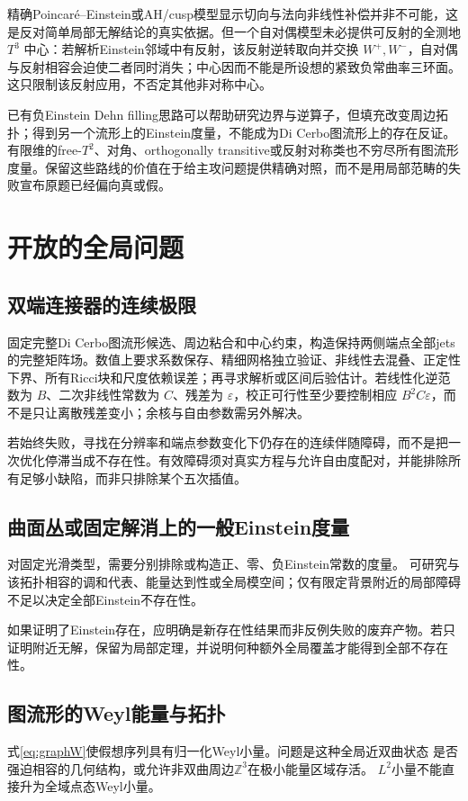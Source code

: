 \documentclass[UTF8,a4paper,11pt,fontset=fandol]{ctexart}
\numberwithin{equation}{section}
\theoremstyle{definition}
\newcommand{\Z}{\mathbb Z}
\begin{document}
精确Poincar\'e--Einstein或AH/cusp模型显示切向与法向非线性补偿并非不可能，这是反对简单局部无解结论的真实依据。但一个自对偶模型未必提供可反射的全测地 $T^3$ 中心：若解析Einstein邻域中有反射，该反射逆转取向并交换 $W^+,W^-$，自对偶与反射相容会迫使二者同时消失；中心因而不能是所设想的紧致负常曲率三环面。这只限制该反射应用，不否定其他非对称中心。

已有负Einstein Dehn filling思路可以帮助研究边界与逆算子，但填充改变周边拓扑；得到另一个流形上的Einstein度量，不能成为Di Cerbo图流形上的存在反证。有限维的free-$T^2$、对角、orthogonally transitive或反射对称类也不穷尽所有图流形度量。保留这些路线的价值在于给主攻问题提供精确对照，而不是用局部范畴的失败宣布原题已经偏向真或假。

\section{开放的全局问题}
\subsection{双端连接器的连续极限}
固定完整Di Cerbo图流形候选、周边粘合和中心约束，构造保持两侧端点全部jets的完整矩阵场。数值上要求系数保存、精细网格独立验证、非线性去混叠、正定性下界、所有Ricci块和尺度依赖误差；再寻求解析或区间后验估计。若线性化逆范数为 $B$、二次非线性常数为 $C$、残差为 $\varepsilon$，校正可行性至少要控制相应 $B^2C\varepsilon$，而不是只让离散残差变小；余核与自由参数需另外解决。

若始终失败，寻找在分辨率和端点参数变化下仍存在的连续伴随障碍，而不是把一次优化停滞当成不存在性。有效障碍须对真实方程与允许自由度配对，并能排除所有足够小缺陷，而非只排除某个五次插值。

\subsection{曲面丛或固定解消上的一般Einstein度量}
对固定光滑类型，需要分别排除或构造正、零、负Einstein常数的度量。
可研究与该拓扑相容的调和代表、能量达到性或全局模空间；仅有限定背景附近的局部障碍
不足以决定全部Einstein不存在性。

如果证明了Einstein存在，应明确是新存在性结果而非反例失败的废弃产物。若只证明附近无解，保留为局部定理，并说明何种额外全局覆盖才能得到全部不存在性。

\subsection{图流形的Weyl能量与拓扑}
式\eqref{eq:graphW}使假想序列具有归一化Weyl小量。问题是这种全局近双曲状态
是否强迫相容的几何结构，或允许非双曲周边$\Z^3$在极小能量区域存活。
$L^2$小量不能直接升为全域点态Weyl小量。
\end{document}
